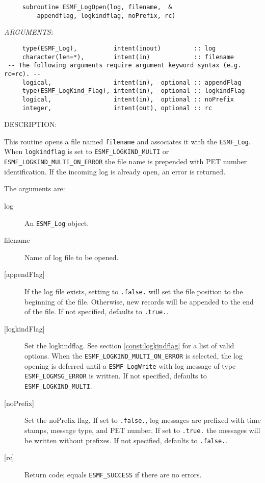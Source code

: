  
\begin{verbatim}     subroutine ESMF_LogOpen(log, filename,  &
         appendflag, logkindflag, noPrefix, rc)\end{verbatim}{\em ARGUMENTS:}
\begin{verbatim}     type(ESMF_Log),          intent(inout)         :: log
     character(len=*),        intent(in)            :: filename
 -- The following arguments require argument keyword syntax (e.g. rc=rc). --
     logical,                 intent(in),  optional :: appendFlag
     type(ESMF_LogKind_Flag), intent(in),  optional :: logkindFlag
     logical,                 intent(in),  optional :: noPrefix
     integer,                 intent(out), optional :: rc
 \end{verbatim}
{\sf DESCRIPTION:\\ }


        This routine opens a file named {\tt filename} and associates
        it with the {\tt ESMF\_Log}.  When {\tt logkindflag} is set to
        {\tt ESMF\_LOGKIND\_MULTI} or {\tt ESMF\_LOGKIND\_MULTI\_ON\_ERROR}
        the file name is prepended with PET number identification.  If the
        incoming log is already open, an error is returned.
  
        The arguments are:
        \begin{description}
        \item [log]
              An {\tt ESMF\_Log} object.
        \item [filename]
              Name of log file to be opened.
        \item [{[appendFlag]}]
              If the log file exists, setting to {\tt .false.} will set the file position
              to the beginning of the file.  Otherwise, new records will be appended to the
              end of the file.  If not specified, defaults to {\tt .true.}.
        \item [{[logkindFlag]}]
              Set the logkindflag. See section \ref{const:logkindflag} for a list of
              valid options.  When the {\tt ESMF\_LOGKIND\_MULTI\_ON\_ERROR} is selected,
              the log opening is deferred until a {\tt ESMF\_LogWrite} with log message of
              type {\tt ESMF\_LOGMSG\_ERROR} is written.
              If not specified, defaults to {\tt ESMF\_LOGKIND\_MULTI}.
        \item [{[noPrefix]}]
              Set the noPrefix flag.  If set to {\tt .false.}, log messages are prefixed
              with time stamps, message type, and PET number.  If set to {\tt .true.} the
              messages will be written without prefixes.  If not specified, defaults to
              {\tt .false.}.
        \item [{[rc]}]
              Return code; equals {\tt ESMF\_SUCCESS} if there are no errors.
        \end{description}
   
